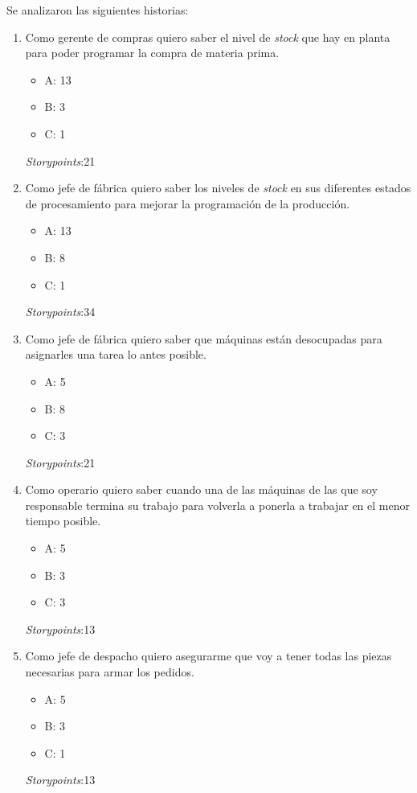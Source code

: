 \documentclass[11pt]{charter}
\begin{document}
Se analizaron las siguientes historias:

\renewcommand{\theenumi}{\arabic{enumi}}
\begin{enumerate}
    \item Como gerente de compras quiero saber el nivel de \textit{stock} que hay en planta para poder programar la compra de materia prima. 
    \begin{itemize}
        \item A: 13
        \item B: 3
        \item C: 1
    \end{itemize}
    \textit{Storypoints}:21
    \item Como jefe de fábrica quiero saber los niveles de \textit{stock} en sus diferentes estados de procesamiento para mejorar la programación de la producción.
    \begin{itemize}
        \item A: 13
        \item B: 8
        \item C: 1
    \end{itemize}
    \textit{Storypoints}:34
    \item Como jefe de fábrica quiero saber que máquinas están desocupadas para asignarles una tarea lo antes posible. 
    \begin{itemize}
        \item A: 5
        \item B: 8
        \item C: 3
    \end{itemize}
    \textit{Storypoints}:21
    \item Como operario quiero saber cuando una de las máquinas de las que soy responsable termina su trabajo para volverla a ponerla a trabajar en el menor tiempo posible. 
    \begin{itemize}
        \item A: 5
        \item B: 3
        \item C: 3
    \end{itemize}
    \textit{Storypoints}:13
    \item Como jefe de despacho quiero asegurarme que voy a tener todas las piezas necesarias para armar los pedidos. 
    \begin{itemize}
        \item A: 5
        \item B: 3
        \item C: 1
    \end{itemize}
    \textit{Storypoints}:13
\end{enumerate}
\end{document}
